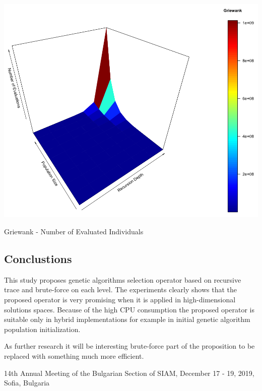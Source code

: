 \documentclass[a0,portrait,25pt]{sciposter}
\begin{document}
\begin{multicols}{3}
\begin{mdframed}[backgroundcolor=white,roundcorner=4pt,shadow=true,linewidth=1pt]
\begin{minipage}[c]{1\linewidth}
\includegraphics[width=0.9\linewidth]{fig08}
\caption{Griewank - Number of Evaluated Individuals}
\end{minipage}

\end{mdframed}

\begin{mdframed}[backgroundcolor=white,roundcorner=4pt,shadow=true,linewidth=1pt] \color{Black}

\section*{Conclustions}
This study proposes genetic algorithms selection operator based on recursive trace and brute-force on each level. The experiments clearly shows that the proposed operator is very promising when it is applied in high-dimensional solutions spaces. Because of the high CPU consumption the proposed operator is suitable only in hybrid implementations for example in initial genetic algorithm population initialization. 

As further research it will be interesting brute-force part of the proposition to be replaced with something much more efficient. 
\end{mdframed}
\end{multicols}

\begin{mdframed}[backgroundcolor=white,roundcorner=4pt,shadow=true,linewidth=1pt]
\color{Black}
14th Annual Meeting of the Bulgarian Section of SIAM, December 17 - 19, 2019, Sofia, Bulgaria
\end{mdframed}
\end{document}
